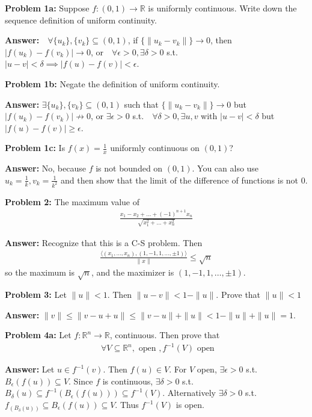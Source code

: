 \documentclass{article}
\newcommand*{\txt}[1]{\text{ #1 }}%
\newcommand*{\iprod}[1]{\langle #1 \rangle}
\newcommand*{\fora}{\txt{}\forall}%
\newcommand*{\rr}{\mathbb{R}}%
\begin{document}
\textbf{Problem 1a:} Suppose $f:(0,1)\to \rr$ is uniformly continuous. Write down the sequence definition of uniform continuity.

\textbf{Answer:} $\fora \{u_k\}, \{v_k\}\subseteq (0,1)$, if $\{\|u_k-v_k\|\}\to 0$, then $|f(u_k)-f(v_k)|\to 0$, or $\fora \epsilon>0, \exists \delta>0$ s.t. $|u-v|<\delta\implies |f(u)-f(v)|<\epsilon$.

\textbf{Problem 1b:} Negate the definition of uniform continuity.

\textbf{Answer:} $\exists \{u_k\}, \{v_k\}\subseteq (0,1)$ such that $\{\|u_k-v_k\|\}\to 0$ but $|f(u_k)-f(v_k)|\not\to 0$, or $\exists \epsilon>0$ s.t. $\fora \delta>0, \exists u,v$ with $|u-v|<\delta$ but $|f(u)-f(v)|\geq \epsilon$.

\textbf{Problem 1c:} Is $f(x)=\frac{1}{x}$ uniformly continuous on $(0,1)$?

\textbf{Answer:} No, because $f$ is not bounded on $(0,1)$. You can also use $u_k=\frac{1}{k},v_k=\frac{1}{k^2}$ and then show that the limit of the difference of functions is not 0.

\textbf{Problem 2:} The maximum value of \begin{align*}
    \frac{x_1-x_2+\dots+(-1)^{n+1}x_n}{\sqrt{x_1^2+\dots+x_n^2}}
\end{align*}

\textbf{Answer:} Recognize that this is a C-S problem. Then \begin{align*}
    \frac{\iprod{(x_1,\dots,x_n),(1,-1,1,\dots,\pm 1)}}{\|x\|}\leq \sqrt{n}
\end{align*} so the maximum is $\sqrt{n}$, and the maximizer is $(1,-1,1,\dots,\pm 1)$.

\textbf{Problem 3:} Let $\|u\|<1$. Then $\|u-v\|<1-\|u\|$. Prove that $\|u\|<1$

\textbf{Answer:} $\|v\|\leq \|v-u+u\|\leq \|v-u\|+\|u\|<1-\|u\|+\|u\|=1$.

\textbf{Problem 4a:} Let $f:\rr^n\to \rr$, continuous. Then prove that \begin{align*}
    \fora V\subseteq \rr^n,\txt{open},f^{-1}(V)\txt{open}
\end{align*}

\textbf{Answer:} Let $u\in f^{-1}(v)$. Then $f(u)\in V$. For $V$ open, $\exists \epsilon>0$ s.t. $B_{\epsilon}(f(u))\subseteq V$. Since $f$ is continuous, $\exists \delta>0$ s.t. $B_{\delta}(u)\subseteq f^{-1}(B_{\epsilon}(f(u)))\subseteq f^{-1}(V)$. Alternatively $\exists \delta>0$ s.t. $f_(B_{\delta}(u))\subseteq B_{\epsilon}(f(u))\subseteq V$. Thus $f^{-1}(V)$ is open.
\end{document}
